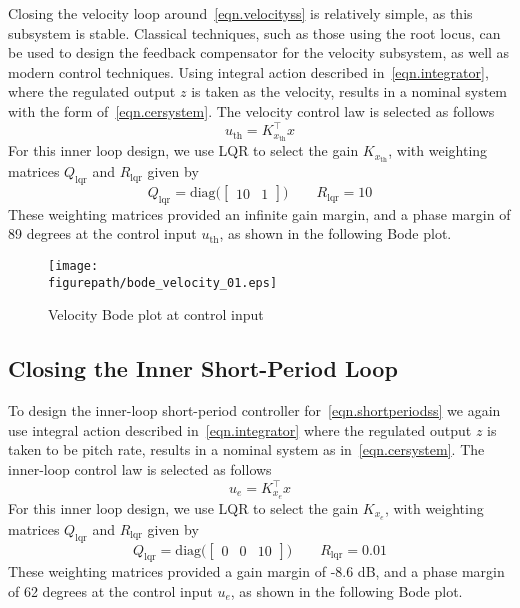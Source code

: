 \documentclass[]{../sty/aiaa-tc}
\newcommand{\figurepath}{../fig}
\theoremstyle{examplestyle}
\begin{document}
  Closing the velocity loop around\ \eqref{eqn.velocityss} is relatively simple, as this subsystem is stable.
  Classical techniques, such as those using the root locus, can be used to design the feedback compensator for the velocity subsystem, as well as modern control techniques.
  Using integral action described in\ \eqref{eqn.integrator}, where the regulated output $z$ is taken as the velocity, results in a nominal system with the form of\ \eqref{eqn.cersystem}.
  The velocity control law is selected as follows
  \begin{equation}
    \label{eqn.uth}
    u_{\text{th}} = K_{x_{\text{th}}}^{\top}x
  \end{equation}
  For this inner loop design, we use LQR to select the gain $K_{x_{\text{th}}}$, with weighting matrices $Q_{\text{lqr}}$ and $R_{\text{lqr}}$ given by
  \begin{equation*}
    Q_{\text{lqr}} = \text{diag}\bigr([
    \begin{array}{ccc}
      10 & 1
    \end{array}]\bigr)
    \qquad
    R_{\text{lqr}} = 10
  \end{equation*}
  These weighting matrices provided an infinite gain margin, and a phase margin of 89 degrees at the control input $u_{\text{th}}$, as shown in the following Bode plot.

  \begin{figure}[H]
    \begin{center}
      \texttt{[image: \\figurepath/bode\_velocity\_01.eps]}
      \vspace{-0.1in}
      \caption{Velocity Bode plot at control input}
    \end{center}
  \end{figure}

  \subsection{Closing the Inner Short-Period Loop}\label{subsec.innerloop}

  To design the inner-loop short-period controller for\ \eqref{eqn.shortperiodss} we again use integral action described in\ \eqref{eqn.integrator} where the regulated output $z$ is taken to be pitch rate, results in a nominal system as in\ \eqref{eqn.cersystem}.
  The inner-loop control law is selected as follows
  \begin{equation}
    \label{eqn.ue}
    u_{e} = K_{x_{e}}^{\top}x
  \end{equation}
  For this inner loop design, we use LQR to select the gain $K_{x_{e}}$, with weighting matrices $Q_{\text{lqr}}$ and $R_{\text{lqr}}$ given by
  \begin{equation*}
    Q_{\text{lqr}} = \text{diag}\bigr([
    \begin{array}{ccc}
      0 & 0 & 10
    \end{array}]\bigr)
    \qquad
    R_{\text{lqr}} = 0.01
  \end{equation*}
  These weighting matrices provided a gain margin of -8.6 dB, and a phase margin of 62 degrees at the control input $u_{e}$, as shown in the following Bode plot.
\end{document}
